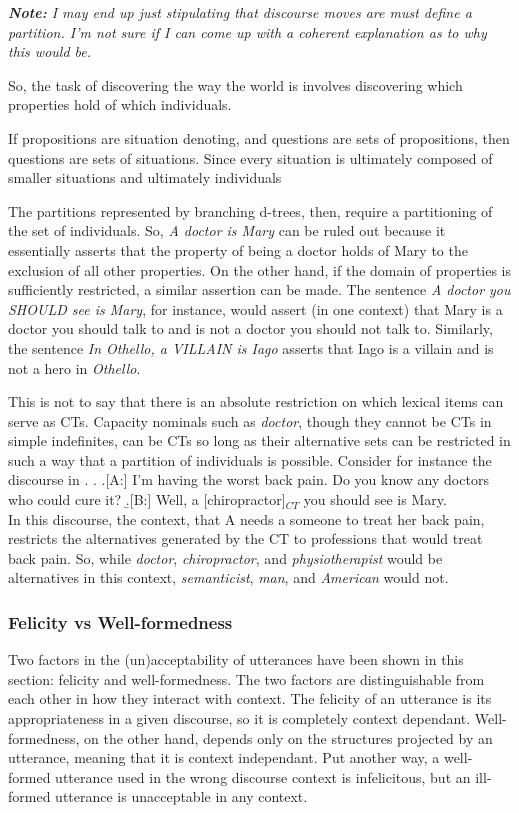 \documentclass[GPFinal]{subfiles}
\begin{document}
\singlespacing \textit{\textbf{Note:} I may end up just stipulating that discourse moves are must define a partition. I'm not sure if I can come up with a coherent explanation as to why this would be.}
\doublespacing

So, the task of discovering the way the world is involves discovering which properties hold of which individuals.

If propositions are situation denoting, and questions are sets of propositions, then questions are sets of situations.
Since every situation is ultimately composed of smaller situations and ultimately individuals

The partitions represented by branching d-trees, then, require a partitioning of the set of individuals.
So, \textit{A doctor is Mary} can be ruled out because it essentially asserts that the property of being a doctor holds of Mary to the exclusion of all other properties.
On the other hand, if the domain of properties is sufficiently restricted, a similar assertion can be made.
The sentence \textit{A doctor you SHOULD see is Mary}, for instance, would assert (in one context) that Mary is a doctor you should talk to and is not a doctor you should not talk to.
Similarly, the sentence \textit{In Othello, a VILLAIN is Iago} asserts that Iago is a villain and is not a hero in \textit{Othello}.

This is not to say that there is an absolute restriction on which lexical items can serve as CTs.
Capacity nominals such as \textit{doctor}, though they cannot be CTs in simple indefinites, can be CTs so long as their alternative sets can be restricted in such a way that a partition of individuals is possible.
Consider for instance the discourse in \Next.
\ex.
\a.[A:] I'm having the worst back pain. Do you know any doctors who could cure it?
\b.[B:] Well, a [chiropractor]$_{CT}$ you should see is Mary.\\

In this discourse, the context, that A needs a someone to treat her back pain, restricts the alternatives generated by the CT to professions that would treat back pain.
So, while \textit{doctor}, \textit{chiropractor}, and \textit{physiotherapist} would be alternatives in this context, \textit{semanticist}, \textit{man}, and \textit{American} would not.


\subsubsection{Felicity vs Well-formedness}
Two factors in the (un)acceptability of utterances have been shown in this section: felicity and well-formedness.
The two factors are distinguishable from each other in how they interact with context.
The felicity of an utterance is its appropriateness in a given discourse, so it is completely context dependant.
Well-formedness, on the other hand, depends only on the structures projected by an utterance, meaning that it is context independant.
Put another way, a well-formed utterance used in the wrong discourse context is infelicitous, but an ill-formed utterance is unacceptable in any context.
\end{document}
